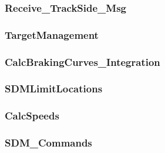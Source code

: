\subsubsection{Receive\_TrackSide\_Msg}


\subsubsection{TargetManagement}


\subsubsection{CalcBrakingCurves\_Integration}


\subsubsection{SDMLimitLocations}


\subsubsection{CalcSpeeds}


\subsubsection{SDM\_Commands}


